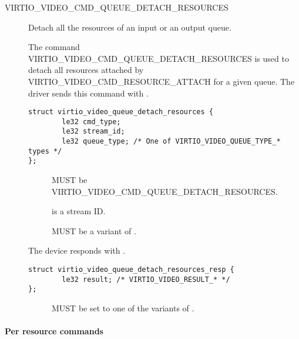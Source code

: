 \begin{description}
\item[VIRTIO_VIDEO_CMD_QUEUE_DETACH_RESOURCES] Detach all the resources of an
  input or an output queue.

The command VIRTIO_VIDEO_CMD_QUEUE_DETACH_RESOURCES is used to detach all
resources attached by VIRTIO_VIDEO_CMD_RESOURCE_ATTACH for a given queue.
The driver sends this command with .
\begin{lstlisting}
struct virtio_video_queue_detach_resources {
        le32 cmd_type;
        le32 stream_id;
        le32 queue_type; /* One of VIRTIO_VIDEO_QUEUE_TYPE_* types */
};
\end{lstlisting}
\begin{description}
\item[] MUST be VIRTIO_VIDEO_CMD_QUEUE_DETACH_RESOURCES.
\item[] is a stream ID.
\item[] MUST be a variant of .
\end{description}

The device responds with .
\begin{lstlisting}
struct virtio_video_queue_detach_resources_resp {
        le32 result; /* VIRTIO_VIDEO_RESULT_* */
};
\end{lstlisting}
\begin{description}
\item[] MUST be set to one of the variants of .
\end{description}
\end{description}

\paragraph{Per resource commands}

